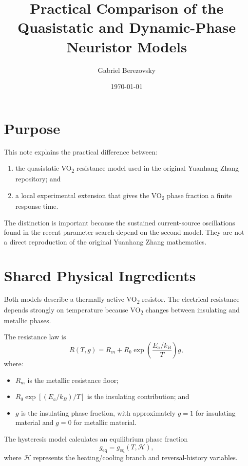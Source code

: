 \documentclass[11pt]{article}
\title{Practical Comparison of the Quasistatic and Dynamic-Phase \VOtwo{} Neuristor Models}
\author{Gabriel Berezovsky}
\date{\today}
\newcommand{\VOtwo}{VO\textsubscript{2}}
\begin{document}
\maketitle

\section{Purpose}

This note explains the practical difference between:
\begin{enumerate}
    \item the quasistatic \VOtwo{} resistance model used in the original Yuanhang Zhang repository; and
    \item a local experimental extension that gives the \VOtwo{} phase fraction a finite response time.
\end{enumerate}

The distinction is important because the sustained current-source oscillations found in the recent parameter search depend on the second model. They are not a direct reproduction of the original Yuanhang Zhang mathematics.

\section{Shared Physical Ingredients}

Both models describe a thermally active \VOtwo{} resistor. The electrical resistance depends strongly on temperature because \VOtwo{} changes between insulating and metallic phases.

The resistance law is
\begin{equation}
R(T,g) = R_m + R_0 \exp\left(\frac{E_a/k_B}{T}\right) g,
\label{eq:resistance}
\end{equation}
where:
\begin{itemize}
    \item $R_m$ is the metallic resistance floor;
    \item $R_0\exp[(E_a/k_B)/T]$ is the insulating contribution; and
    \item $g$ is the insulating phase fraction, with approximately $g=1$ for insulating material and $g=0$ for metallic material.
\end{itemize}

The hysteresis model calculates an equilibrium phase fraction
\begin{equation}
g_{\mathrm{eq}} = g_{\mathrm{eq}}(T,\mathcal{H}),
\label{eq:geq}
\end{equation}
where $\mathcal{H}$ represents the heating/cooling branch and reversal-history variables.
\end{document}
